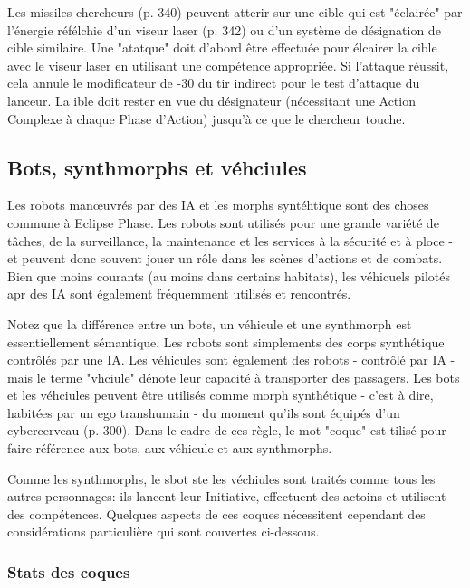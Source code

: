 Les missiles chercheurs (p. 340) peuvent atterir sur une cible qui est "éclairée" par l'énergie réfélchie d'un viseur laser (p. 342) ou d'un système de désignation de cible similaire. Une "atatque" doit d'abord être effectuée pour élcairer la cible avec le viseur laser en utilisant une compétence appropriée. Si l'attaque réussit, cela annule le modificateur de -30 du tir indirect pour le test d'attaque du lanceur. La ible doit rester en vue du désignateur (nécessitant une Action Complexe à chaque Phase d'Action) jusqu'à ce que le chercheur touche. 

\subsection{Bots, synthmorphs et véhciules} \label{sec:bots-synthmorphs-vehicles} 

Les robots manœuvrés par des IA et les morphs syntéhtique sont des choses commune à Eclipse Phase. Les robots sont utilisés pour une grande variété de tâches, de la surveillance, la maintenance et les services à la sécurité et à ploce - et peuvent donc souvent jouer un rôle dans les scènes d'actions et de combats. Bien que moins courants (au moins dans certains habitats), les véhicuels pilotés apr des IA sont également fréquemment utilisés et rencontrés. 

Notez que la différence entre un bots, un véhicule et une synthmorph est essentiellement sémantique. Les robots sont simplements des corps synthétique contrôlés par une IA. Les véhicules sont également des robots - contrôlé par IA - mais le terme "vhciule" dénote leur capacité à transporter des passagers. Les bots et les véhciules peuvent être utilisés comme morph synthétique - c'est à dire, habitées par un ego transhumain - du moment qu'ils sont équipés d'un cybercerveau (p. 300). Dans le cadre de ces règle, le mot "coque" est tilisé pour faire référence aux bots, aux véhicule et aux synthmorphs. 

Comme les synthmorphs, le sbot ste les véchiules sont traités comme tous les autres personnages: ils lancent leur Initiative, effectuent des actoins et utilisent des compétences. Quelques aspects de ces coques nécessitent cependant des considérations particulière qui sont couvertes ci-dessous. 

\subsubsection{Stats des coques} 

